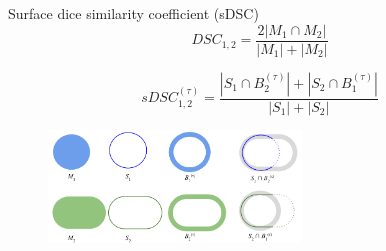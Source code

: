 \documentclass[9pt]{beamer}
\begin{document}
\begin{frame}{Surface dice similarity coefficient (sDSC)}
  \begin{equation*}
    DSC_{1,2} = \frac{2|M_{1} \cap M_{2}|}{|M_{1}| + |M_{2}|}
    \label{eq:sDSC}
  \end{equation*}

  \vspace{4mm}

  \begin{equation*}
    sDSC_{1,2}^{(\tau)} = \frac{|S_{1} \cap B_{2}^{(\tau)}| + |S_{2} \cap B_{1}^{(\tau)}|}{|S_{1}| + |S_{2}|}
    \label{eq:sDSC}
  \end{equation*}

  \vspace{4mm}
  \begin{figure}
    \includegraphics[width=0.6\textwidth]{images/sDSC}
  \end{figure}
\end{frame}

%
\end{document}
